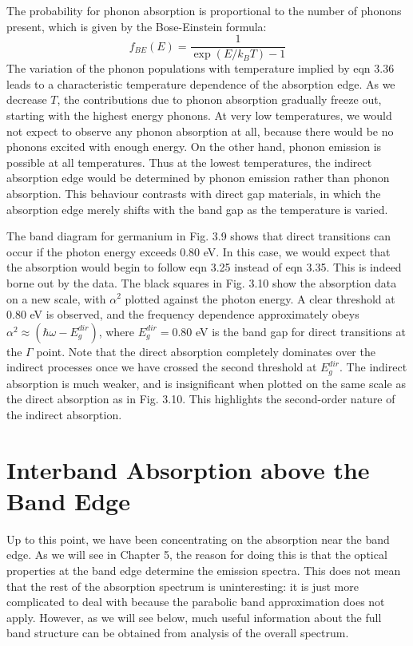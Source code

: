 \documentclass[12pt]{book}
\begin{document}
The probability for phonon absorption is proportional to the number of phonons present, which is given by the Bose-Einstein formula:
\begin{equation}\label{equa:3.36}
  f_{BE}(E)=\frac{1}{\exp(E/k_BT)-1}
\end{equation}
The variation of the phonon populations with temperature implied by eqn 3.36 leads to a characteristic temperature dependence of the absorption edge. As we decrease $T$, the contributions due to phonon absorption gradually freeze out, starting with the highest energy phonons. At very low temperatures, we would not expect to observe any phonon absorption at all, because there would be no phonons excited with enough energy. On the other hand, phonon emission is possible at all temperatures. Thus at the lowest temperatures, the indirect absorption edge would be determined by phonon emission rather than phonon absorption. This behaviour contrasts with direct gap materials, in which the absorption edge merely shifts with the band gap as the temperature is varied.

The band diagram for germanium in Fig. 3.9 shows that direct transitions can occur if the photon energy exceeds 0.80 eV. In this case, we would expect that the absorption would begin to follow eqn 3.25 instead of eqn 3.35. This is indeed borne out by the data. The black squares in Fig. 3.10 show the absorption data on a new scale, with $\alpha^2$ plotted against the photon energy. A clear threshold at 0.80 eV is observed, and the frequency dependence approximately obeys $\alpha^2\approx(\hbar\omega-E_g^{dir})$, where $E_g^{dir}=0.80$ eV is the band gap for direct transitions at the $\Gamma$ point. Note that the direct absorption completely dominates over the indirect processes once we have crossed the second threshold at $E_g^{dir}$. The indirect absorption is much weaker, and is insignificant when plotted on the same scale as the direct absorption as in Fig. 3.10. This highlights the second-order nature of the indirect absorption.

\section{Interband Absorption above the Band Edge}

Up to this point, we have been concentrating on the absorption near the band edge. As we will see in Chapter 5, the reason for doing this is that the optical properties at the band edge determine the emission spectra. This does not mean that the rest of the absorption spectrum is uninteresting: it is just more complicated to deal with because the parabolic band approximation does not apply. However, as we will see below, much useful information about the full band structure can be obtained from analysis of the overall spectrum.
\end{document}
